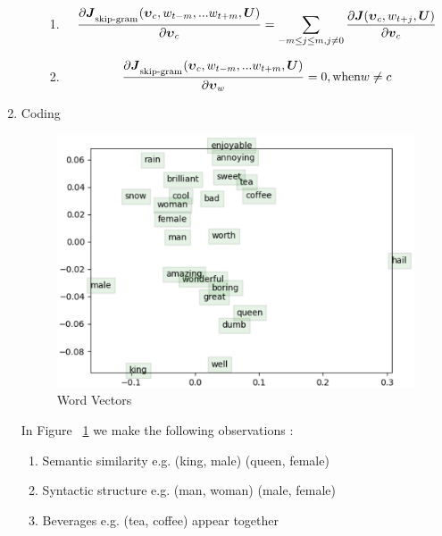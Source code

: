 \documentclass[]{article}
\begin{document}
\begin{enumerate}
\begin{enumerate}
\begin{enumerate}
      \item
	
		\begin{equation}	
		\frac{\partial 		\boldsymbol{J}_\textsubscript{skip-gram}(\boldsymbol{\upsilon}_c, w_{t-m},... w_{t+m}, \boldsymbol{U})}{\partial \boldsymbol{\upsilon}_{c}} = 
				\sum_{-m \leq j \leq m, j \neq 0} \frac{\partial 		\boldsymbol{J}(\boldsymbol{\upsilon}_c, w_{t+j}, \boldsymbol{U})}{\partial \boldsymbol{v}_{c}}
		\end{equation}	
			
			\item 
		
		\begin{equation}	
		\frac{\partial 		\boldsymbol{J}_\textsubscript{skip-gram}(\boldsymbol{\upsilon}_c, w_{t-m},... w_{t+m}, \boldsymbol{U})}{\partial \boldsymbol{\upsilon}_{w}} = 0, 
		\text{when} w \neq c
		\end{equation}
			
    \end{enumerate}
  
	\end{enumerate}

	\item Coding
	
	\begin{figure}
    \centering
    \includegraphics{word_vectors}
    \caption{Word Vectors}
    \label{fig:word_vectors}
	\end{figure}
	
	In Figure ~\ref{fig:word_vectors} we make the following observations :
	\begin{enumerate}
	\item Semantic similarity e.g. (king, male)  (queen, female)
	\item Syntactic structure e.g. (man, woman)  (male, female)
	\item Beverages e.g. (tea, coffee) appear together
	\end{enumerate}
	
\end{enumerate}
\end{document}
